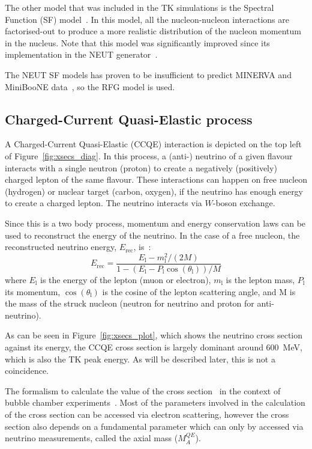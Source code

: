 The other model that was included in the \Gls{TK} simulations is the
Spectral Function (\Gls{SF}) model~\cite{Benhar}. In this model, all
the nucleon-nucleon interactions are factorised-out to produce a more
realistic distribution of the nucleon momentum in the nucleus. Note
that this model was significantly improved since its implementation in
the \Gls{NEUT} generator~\cite{Rocco:2016vyz}.

The \Gls{NEUT} \Gls{SF} models has proven to be insufficient to
predict \Gls{MINERVA} and \Gls{MiniBooNE} data~\cite{CallumFit}, so
the \Gls{RFG} model is used.

\subsection{Charged-Current Quasi-Elastic process}
\label{subsec:ccqe}
A Charged-Current Quasi-Elastic (\Gls{CCQE}) interaction is depicted
on the top left of Figure~\ref{fig:xsecs_diag}. In this process, a
(anti-) neutrino of a given flavour interacts with a single neutron
(proton) to create a negatively (positively) charged lepton of the
same flavour. These interactions can happen on free nucleon (hydrogen)
or nuclear target (carbon, oxygen), if the neutrino has enough energy
to create a charged lepton. The neutrino interacts via $W$-boson
exchange.

Since this is a two body process, momentum and energy conservation
laws can be used to reconstruct the energy of the neutrino. In the
case of a free nucleon, the reconstructed neutrino energy,
$E_\text{rec}$, is~\cite{MartiniERec}:
\begin{equation}
\label{eq:ereco}
E_{\text{rec}}=\frac{E_\text{l}-m_\text{l}^2/(2M)}
{1-\left(E_\text{l}-P_\text{l}\cos\left(\theta_\text{l}\right) \right)/M}
\end{equation}
where $E_\text{l}$ is the energy of the lepton (muon or electron),
$m_\text{l}$ is the lepton mass, $P_\text{l}$ its momentum,
$\cos\left(\theta_\text{l}\right)$ is the cosine of the lepton
scattering angle, and M is the mass of the struck nucleon (neutron for
neutrino and proton for anti-neutrino).

As can be seen in Figure~\ref{fig:xsecs_plot}, which shows the
neutrino cross section against its energy, the \Gls{CCQE} cross
section is largely dominant around 600~MeV, which is also the \Gls{TK}
peak energy. As will be described later, this is not a coincidence.

The formalism to calculate the value of the cross
section~\cite{LlewellynSmith} in the context of bubble chamber
experiments~\cite{ANLCCQE,BNLCCQE,CERNCCQE}. Most of the parameters
involved in the calculation of the cross section can be accessed via
electron scattering, however the cross section also depends on a
fundamental parameter which can only by accessed via neutrino
measurements, called the axial mass ($M_A^{QE}$).


